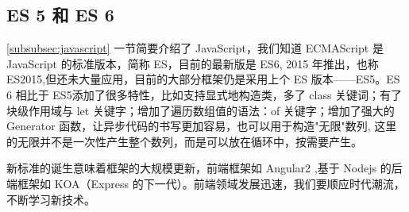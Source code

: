\documentclass[UTF8]{ctexbook}
\begin{document}
{{        \subsection{ES 5 和 ES 6}
          \label{subsubsec:es_5_和_es_6}
            \ref{subsubsec:javascript} 一节简要介绍了 JavaScript，我们知道 ECMAScript 是 JavaScript 的标准版本，简称 ES，目前的最新版是 ES6, 2015 年推出，也称 ES2015,但还未大量应用，目前的大部分框架仍是采用上个 ES 版本——ES5。ES 6 相比于 ES5添加了很多特性，比如支持显式地构造类，多了 class 关键词；有了块级作用域与 let 关键字；增加了遍历数组值的语法：of 关键字；增加了强大的 Generator 函数，让异步代码的书写更加容易，也可以用于构造"无限"数列, 这里的无限并不是一次性产生整个数列，而是可以放在循环中，按需要产生。
            \par
            新标准的诞生意味着框架的大规模更新，前端框架如 Angular2 ,基于 Nodejs 的后端框架如 KOA（Express 的下一代）。前端领域发展迅速，我们要顺应时代潮流，不断学习新技术。

}}
\end{document}
